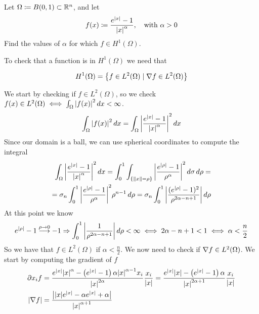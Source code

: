 \newpage
\begin{exercise}
    Let \(\Omega \coloneqq B(0, 1) \subset \mathbb{R}^n\), and let 
    \[
        f(x) \coloneqq \frac{e^{\abs{x}}-1}{\abs{x}^\alpha}, \quad \text{with } \alpha > 0
    \]
    Find the values of \(\alpha\) for which \(f \in H^1(\Omega)\).
\end{exercise}
To check that a function is in \(H^1(\Omega)\) we need that
\begin{remark}
    \[
        H^1(\Omega) = \left\{ f \in L^2(\Omega) \mid \nabla f \in L^2(\Omega) \right\}
    \]  
\end{remark}
We start by checking if \(f \in L^2(\Omega)\), so we check \(f(x) \in L^2(\Omega) \iff \int_\Omega \abs{f(x)}^2 \, dx < \infty\).
\[
    \begin{split}
        \int_\Omega \abs{f(x)}^2 \, dx = \int_\Omega \abs{\frac{e^{\abs{x}}-1}{\abs{x}^\alpha}}^2 \, dx
    \end{split}
\]
Since our domain is a ball, we can use spherical coordinates to compute the integral
\[
    \begin{split}
        \int_\Omega \abs{\frac{e^{\abs{x}}-1}{\abs{x}^\alpha}}^2 \, dx = \int_0^1 \int_{\left\{\norm{x} = \rho\right\}} \abs{\frac{e^{\abs{\rho}}-1}{\rho^\alpha}}^2 \, d\sigma \, d\rho = \\
        = \sigma_n \int_0^1 \abs{\frac{e^{\abs{\rho}}-1}{\rho^\alpha}}^2 \rho^{n-1} \, d\rho = \sigma_n \int_0^1 \abs{\frac{(e^{\abs{\rho}}-1)^2}{\rho^{2\alpha - n +1}}} \, d\rho
    \end{split}
\]
At this point we know 
\[
    \begin{split}
        e^{\abs{\rho}} -1 \overset{\rho \to 0}{\longrightarrow} -1 \Rightarrow \int_0^1 \abs{\frac{1}{\rho^{2\alpha - n + 1}}} \, d\rho < \infty \iff 2 \alpha - n + 1 < 1 \iff \alpha < \frac{n}{2}
    \end{split}
\]
So we have that \(f \in L^2(\Omega)\) if \(\alpha < \frac{n}{2}\). We now need to check if \(\nabla f \in L^2(\Omega)\). We start by computing the gradient of \(f\)
\[
    \begin{split}
        \partial x_i f &= \frac{e^{\abs{x}} \abs{x}^{\alpha} - \left(e^{\abs{x}} - 1\right) \alpha \abs{x}^{\alpha - 1} x_i}{\abs{x}^{2\alpha}} \frac{x_i}{\abs{x}} = \frac{e^{\abs{x}} \abs{x} - \left(e^{\abs{x}} - 1\right) \alpha}{\abs{x}^{2\alpha + 1}} \frac{x_i}{\abs{x}} \\
        \abs{\nabla f} &= \frac{\abs{\abs{x} e^{\abs{x}} - \alpha e^{\abs{x}} + \alpha}}{\abs{x}^{\alpha + 1}}
    \end{split}
\]
